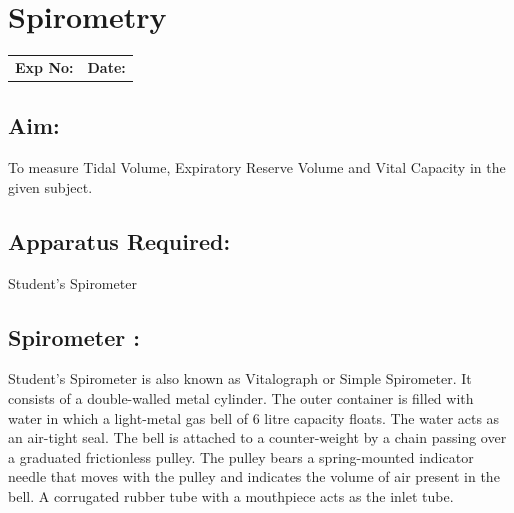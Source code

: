 \documentclass[a4paper,12pt,openany,twoside]{book}
\begin{document}
															\chapter*{\centering Spirometry}

															\begin{tabular}{p{4.5in} p{1in}}
																\textbf{Exp No:}  & \textbf{Date:}\\
															\end{tabular}
															\section*{Aim:}
															To measure Tidal Volume, Expiratory Reserve Volume and Vital Capacity in the given subject.
															\section*{Apparatus Required:}
															Student’s Spirometer
															\section*{Spirometer :}
															Student’s Spirometer is also known as Vitalograph or Simple Spirometer. It consists of a double-walled metal cylinder. The outer container is filled with water in which a light-metal gas bell of 6 litre capacity floats. The water acts as an air-tight seal. The bell is attached to a counter-weight by a chain passing over a graduated frictionless pulley. The pulley bears a spring-mounted indicator needle that moves with the pulley and indicates the volume of air present in the bell. A corrugated rubber tube with a mouthpiece acts as the inlet tube.
\end{document}
